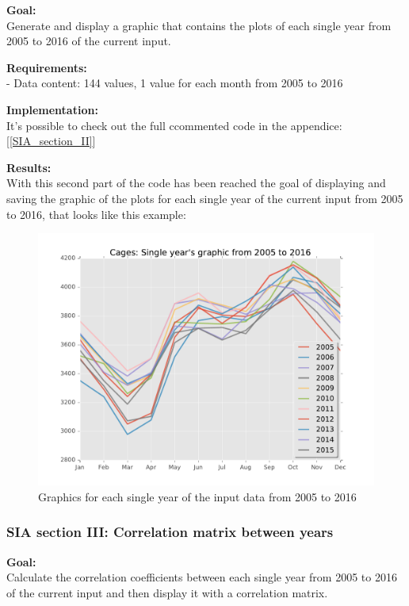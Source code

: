 \textbf{Goal:}\\
Generate and display a graphic that contains the plots of each single year from 2005 to 2016 of the current input. 

\textbf{Requirements:}\\
- Data content: 144 values, 1 value for each month from 2005 to 2016

\textbf{Implementation:}\\
It's possible to check out the full ccommented code in the appendice: [\ref{SIA_section_II}]

\textbf{Results:} \\
With this second part of the code has been reached the goal of displaying and saving the graphic of the plots for each single year of the current input from 2005 to 2016, that looks like this example:

\begin{figure}[H]
	\centering
    \includegraphics[width=1\textwidth]{Files/Cages_Years.pdf}
    \caption{Graphics for each single year of the input data from 2005 to 2016}
\end{figure}




\newpage
\subsubsection{SIA section III: Correlation matrix between years}

\textbf{Goal:}\\
Calculate the correlation coefficients between each single year from 2005 to 2016 of the current input and then display it with a correlation matrix.

